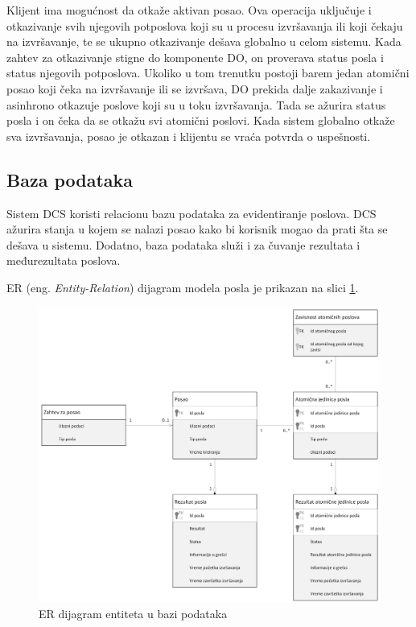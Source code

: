 \documentclass[12pt,oneside]{memoir}
\begin{document}
Klijent ima mogućnost da otkaže aktivan posao. Ova operacija uključuje i otkazivanje svih njegovih potposlova koji su u procesu izvršavanja ili koji čekaju na izvršavanje, te se ukupno otkazivanje dešava globalno u celom sistemu.
Kada zahtev za otkazivanje stigne do komponente DO, on proverava status posla i status njegovih potposlova. Ukoliko u tom trenutku postoji barem jedan atomični posao koji čeka na izvršavanje ili se izvršava, DO prekida dalje zakazivanje i asinhrono otkazuje poslove koji su u toku izvršavanja. Tada se ažurira status posla i on čeka da se otkažu svi atomični poslovi. Kada sistem globalno otkaže sva izvršavanja, posao je otkazan i klijentu se vraća potvrda o uspešnosti.


\subsection{Baza podataka}

Sistem DCS koristi relacionu bazu podataka za evidentiranje poslova. DCS ažurira stanja u kojem se nalazi posao kako bi korisnik mogao da prati šta se dešava u sistemu. Dodatno, baza podataka služi i za čuvanje rezultata i međurezultata poslova.

ER (eng. \emph{Entity-Relation}) dijagram modela posla je prikazan na slici \ref{fig:erposao}.

\begin{figure}[!ht]
  \centering
  \includegraphics[width=1.0\textwidth]{./images/uml_er_dijagram_posao.png}
  \caption{ER dijagram entiteta u bazi podataka}
  \label{fig:erposao}
\end{figure}
\end{document}
